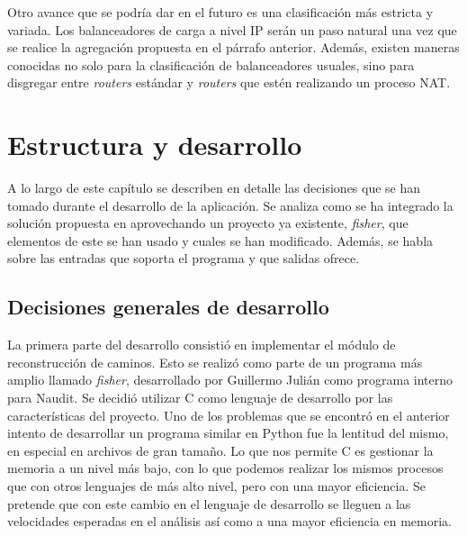 \documentclass[twoside, 12pt]{epstfg}
\begin{document}
Otro avance que se podría dar en el futuro es una clasificación más estricta y variada. Los balanceadores de carga a nivel IP serán un paso natural una vez que se realice la agregación propuesta en el párrafo anterior. Además, existen maneras conocidas no solo para la clasificación de balanceadores usuales, sino para disgregar entre \textit{routers} estándar y \textit{routers} que estén realizando un proceso NAT.

\chapter{Estructura y desarrollo}
\label{chap:Desarrollo}
A lo largo de este capítulo se describen en detalle las decisiones que se han tomado durante el desarrollo de la aplicación. Se analiza como se ha integrado la solución propuesta en aprovechando un proyecto ya existente, \textit{fisher}, que elementos de este se han usado y cuales se han modificado. Además, se habla sobre las entradas que soporta el programa y que salidas ofrece.

\section{Decisiones generales de desarrollo}
La primera parte del desarrollo consistió en implementar el módulo de reconstrucción de caminos. Esto se realizó como parte de un programa más amplio llamado \textit{fisher}, desarrollado por Guillermo Julián como programa interno para Naudit. Se decidió utilizar C como lenguaje de desarrollo por las características del proyecto. Uno de los problemas que se encontró en el anterior intento de desarrollar un programa similar en Python fue la lentitud del mismo, en especial en archivos de gran tamaño. Lo que nos permite C es gestionar la memoria a un nivel más bajo, con lo que podemos realizar los mismos procesos que con otros lenguajes de más alto nivel, pero con una mayor eficiencia. Se pretende que con este cambio en el lenguaje de desarrollo se lleguen a las velocidades esperadas en el análisis así como a una mayor eficiencia en memoria.
\end{document}
